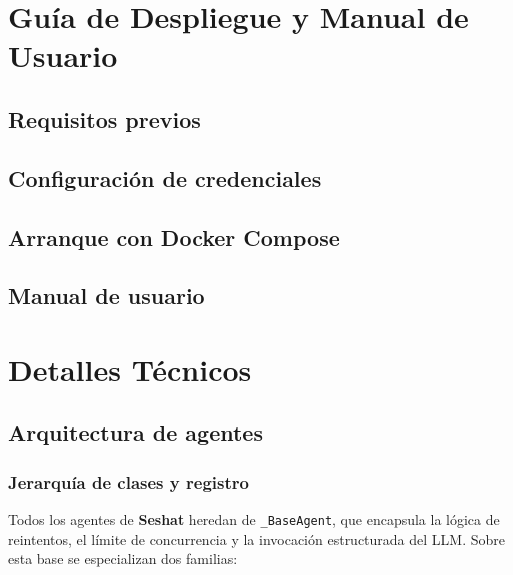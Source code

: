 \chapter{Guía de Despliegue y Manual de Usuario}
\label{anx:despliegue}

\section{Requisitos previos}

\section{Configuración de credenciales}

\section{Arranque con Docker Compose}

\section{Manual de usuario}

\chapter{Detalles Técnicos}
\label{anx:tecnico}

\section{Arquitectura de agentes}

\subsection{Jerarquía de clases y registro}
\label{anx:jerarquia-agentes}

Todos los agentes de \textbf{Seshat} heredan de \texttt{\_BaseAgent}, que encapsula la lógica
de reintentos, el límite de concurrencia y la invocación estructurada del LLM. Sobre esta base
se especializan dos familias:

